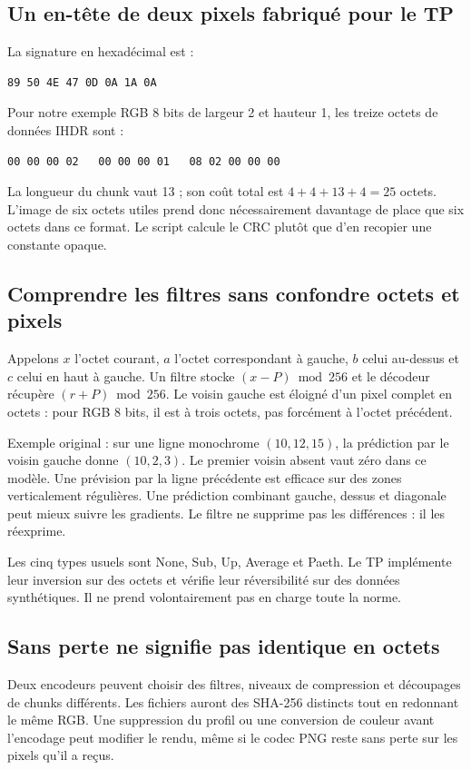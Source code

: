 \subsection{Un en-tête de deux pixels fabriqué pour le TP}
La signature en hexadécimal est :
\begin{verbatim}
89 50 4E 47 0D 0A 1A 0A
\end{verbatim}
Pour notre exemple RGB 8 bits de largeur 2 et hauteur 1,
les treize octets de données IHDR sont :
\begin{verbatim}
00 00 00 02   00 00 00 01   08 02 00 00 00
\end{verbatim}
La longueur du chunk vaut 13 ; son coût total est
$4+4+13+4=25$ octets. L'image de six octets utiles prend
donc nécessairement davantage de place que six octets dans
ce format. Le script calcule le CRC plutôt que d'en recopier
une constante opaque.

\subsection{Comprendre les filtres sans confondre octets et pixels}
Appelons $x$ l'octet courant, $a$ l'octet correspondant à gauche,
$b$ celui au-dessus et $c$ celui en haut à gauche. Un filtre
stocke $(x-P)\bmod256$ et le décodeur récupère
$(r+P)\bmod256$. Le voisin gauche est éloigné d'un pixel
complet en octets : pour RGB 8 bits, il est à trois octets,
pas forcément à l'octet précédent.

Exemple original : sur une ligne monochrome $(10,12,15)$,
la prédiction par le voisin gauche donne $(10,2,3)$.
Le premier voisin absent vaut zéro dans ce modèle. Une
prévision par la ligne précédente est efficace sur des
zones verticalement régulières. Une prédiction combinant
gauche, dessus et diagonale peut mieux suivre les gradients.
Le filtre ne supprime pas les différences : il les réexprime.

Les cinq types usuels sont None, Sub, Up, Average et Paeth.
Le TP implémente leur inversion sur des octets et vérifie
leur réversibilité sur des données synthétiques. Il ne
prend volontairement pas en charge toute la norme.

\subsection{Sans perte ne signifie pas identique en octets}
Deux encodeurs peuvent choisir des filtres, niveaux de
compression et découpages de chunks différents. Les fichiers
auront des SHA-256 distincts tout en redonnant le même RGB.
Une suppression du profil ou une conversion de couleur avant
l'encodage peut modifier le rendu, même si le codec PNG reste
sans perte sur les pixels qu'il a reçus.

